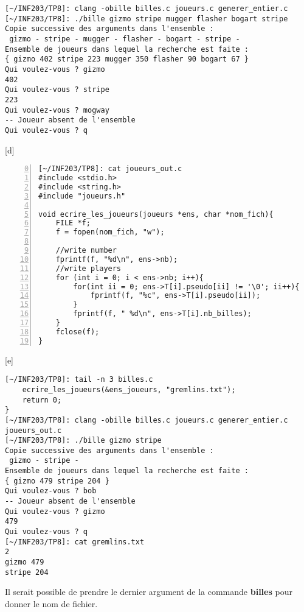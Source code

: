 \documentclass[12pt,a4paper,notitlepage,colorinlistoftodos]{article}
\begin{document}
\begin{lstlisting}
[~/INF203/TP8]: clang -obille billes.c joueurs.c generer_entier.c
[~/INF203/TP8]: ./bille gizmo stripe mugger flasher bogart stripe
Copie successive des arguments dans l'ensemble :
 gizmo - stripe - mugger - flasher - bogart - stripe -
Ensemble de joueurs dans lequel la recherche est faite :
{ gizmo 402 stripe 223 mugger 350 flasher 90 bogart 67 }
Qui voulez-vous ? gizmo
402
Qui voulez-vous ? stripe
223
Qui voulez-vous ? mogway
-- Joueur absent de l'ensemble
Qui voulez-vous ? q
\end{lstlisting}


[d]
\begin{lstlisting}[numbers=left, firstnumber = 0 ]
[~/INF203/TP8]: cat joueurs_out.c
#include <stdio.h>
#include <string.h>
#include "joueurs.h"

void ecrire_les_joueurs(joueurs *ens, char *nom_fich){
    FILE *f;
    f = fopen(nom_fich, "w");

    //write number
    fprintf(f, "%d\n", ens->nb);
    //write players
    for (int i = 0; i < ens->nb; i++){
        for(int ii = 0; ens->T[i].pseudo[ii] != '\0'; ii++){
            fprintf(f, "%c", ens->T[i].pseudo[ii]);
        }
        fprintf(f, " %d\n", ens->T[i].nb_billes);
    }
    fclose(f);
}
\end{lstlisting}

[e]
\begin{lstlisting}
[~/INF203/TP8]: tail -n 3 billes.c
    ecrire_les_joueurs(&ens_joueurs, "gremlins.txt");
    return 0;
}
[~/INF203/TP8]: clang -obille billes.c joueurs.c generer_entier.c joueurs_out.c
[~/INF203/TP8]: ./bille gizmo stripe
Copie successive des arguments dans l'ensemble :
 gizmo - stripe -
Ensemble de joueurs dans lequel la recherche est faite :
{ gizmo 479 stripe 204 }
Qui voulez-vous ? bob
-- Joueur absent de l'ensemble
Qui voulez-vous ? gizmo
479
Qui voulez-vous ? q
[~/INF203/TP8]: cat gremlins.txt 
2
gizmo 479
stripe 204
\end{lstlisting}

Il serait possible de prendre le dernier argument de la commande \textbf{billes} pour donner le nom de fichier. 
\end{document}
